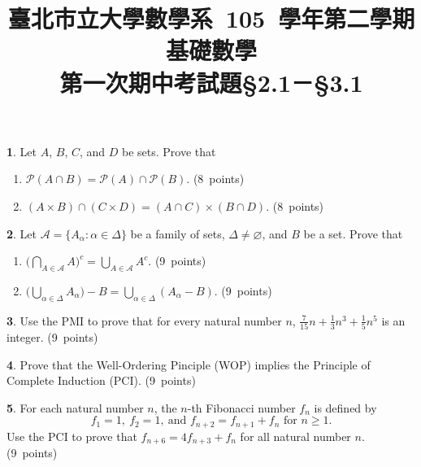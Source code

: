 \documentclass[12pt,a4paper]{article}
\theoremstyle{definition}
\newtheorem{Ex}{}
\newcommand{\set}[1]{\{#1\}}
\renewcommand{\empty}{\varnothing}
\begin{document}
\title{\CJK%
{\normalsize 臺北市立大學數學系~105~學年第二學期}\\[4pt]
\textbf{基礎數學}\\
{\large 第一次期中考試題}{\small \S2.1－\S3.1}%
}
\author{}
\date{\vspace{-10ex}}
\maketitle

\renewcommand{\baselinestretch}{1.5}
\renewcommand{\labelenumi}{(\arabic{enumi})}
\begin{Ex}
Let $A$, $B$, $C$, and $D$ be sets. Prove that
\begin{enumerate}
  \item $\mathcal{P}(A \cap B) = \mathcal{P}(A) \cap \mathcal{P}(B)$. \quad (8~points)
  \item $(A \times B) \cap (C \times D) = (A \cap C) \times (B \cap D)$. \quad (8~points)
\end{enumerate}
\end{Ex}

\begin{Ex}
Let $\mathcal{A} = \set{A_\alpha : \alpha\in\Delta}$ be a family of sets, $\Delta\ne\empty$, and $B$ be a set. Prove that
\begin{enumerate}
  \item $\bigl(\bigcap_{A\in\mathcal{A}}A\bigr)^c = \bigcup_{A\in\mathcal{A}}A^c$. \quad (9~points)
  \item $\bigl(\bigcup_{\alpha\in\Delta}A_\alpha\bigr) - B = \bigcup_{\alpha\in\Delta}(A_\alpha-B)$. \quad (9~points)
\end{enumerate}
\end{Ex}

\begin{Ex}
Use the PMI to prove that for every natural number $n$, $\displaystyle\frac{7}{15}n+\frac{1}{3}n^3+\frac{1}{5}n^5$ is an integer. \quad (9~points)
\end{Ex}

\begin{Ex}
Prove that the Well-Ordering Pinciple (WOP) implies the Principle of Complete Induction (PCI). \quad (9~points)
\end{Ex}

\begin{Ex}
For each natural number $n$, the $n$-th Fibonacci number $f_n$ is defined by
\[
  f_1 = 1,\ f_2 = 1,\ \text{and } f_{n+2} = f_{n+1} + f_n \text{ for } n \ge 1.
\]
Use the PCI to prove that $f_{n+6} = 4f_{n+3} + f_n$ for all natural number $n$. \quad (9~points)
\end{Ex}
\end{document}
